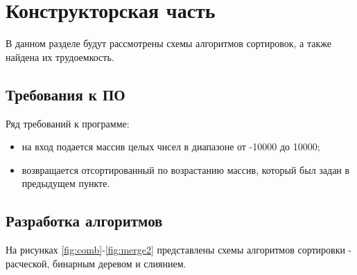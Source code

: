 \chapter{Конструкторская часть}
В данном разделе будут рассмотрены схемы алгоритмов сортировок, а также найдена их трудоемкость.

\section{Требования к ПО}
Ряд требований к программе:
\begin{itemize}
	\item на вход подается массив целых чисел в диапазоне от -10000 до 10000;
    \item возвращается отсортированный по возрастанию массив, который был задан в предыдущем пункте. \newline
\end{itemize}

\section{Разработка алгоритмов}
На рисунках \ref{fig:comb}-\ref{fig:merge2} представлены схемы алгоритмов сортировки - расческой, бинарным деревом и слиянием.

